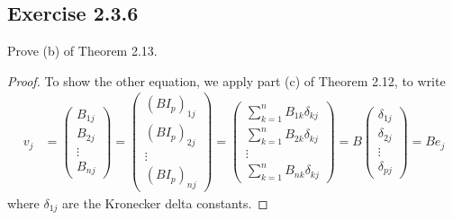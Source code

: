 \subsection*{Exercise 2.3.6} Prove (b) of Theorem 2.13.
\begin{proof}
To show the other equation, we apply part (c) of Theorem 2.12, to write
\begin{align*}
   {v}_{j}  &= \begin{pmatrix}
       {B}_{1j } \\
       {B}_{2j } \\
       \vdots \\
       {B}_{nj } 
   \end{pmatrix} = 
   \begin{pmatrix}
        (B {I}_{p})_{1j} \\  
        {(B{I}_{p})}_{2j} \\
        \vdots \\
        {(B {I}_{p})}_{nj}
   \end{pmatrix} = \begin{pmatrix}
       \sum_{ k=1  }^{ n } {B}_{1k} {\delta}_{kj} \\
       \sum_{ k=1  }^{ n } {B}_{2k} {\delta}_{kj } \\
       \vdots \\
       \sum_{ k=1  }^{ n } {B}_{nk} {\delta}_{kj } 
       \end{pmatrix} = B \begin{pmatrix}
       {\delta}_{1j } \\
       {\delta}_{2j } \\
       \vdots \\
       {\delta}_{pj } 
   \end{pmatrix} = B {e}_{j}
\end{align*}
where \( {\delta}_{1j} \) are the Kronecker delta constants.
\end{proof}

